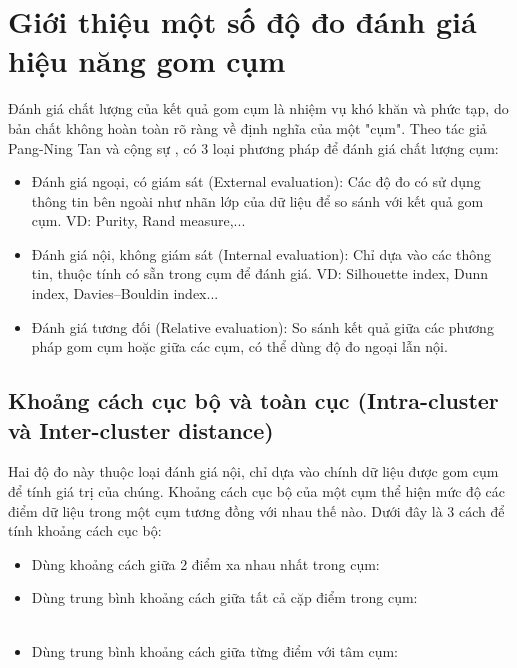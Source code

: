 \section{Giới thiệu một số độ đo đánh giá hiệu năng gom cụm} \label{clusterEvalMetrics}
Đánh giá chất lượng của kết quả gom cụm là nhiệm vụ khó khăn và phức tạp, do bản chất không hoàn toàn rõ ràng về định nghĩa của một "cụm". Theo tác giả Pang-Ning Tan và cộng sự \cite{IntroToDM}, có 3 loại phương pháp để đánh giá chất lượng cụm: 
	\begin{itemize}
		\item Đánh giá ngoại, có giám sát (External evaluation): Các độ đo có sử dụng thông tin bên ngoài như nhãn lớp của dữ liệu để so sánh với kết quả gom cụm.
		VD: Purity, Rand measure,...
		\item Đánh giá nội, không giám sát (Internal evaluation): Chỉ dựa vào các thông tin, thuộc tính có sẵn trong cụm để đánh giá.
		VD: Silhouette index, Dunn index, Davies–Bouldin index...
		\item Đánh giá tương đối (Relative evaluation): So sánh kết quả giữa các phương pháp gom cụm hoặc giữa các cụm, có thể dùng độ đo ngoại lẫn nội.
	\end{itemize}

	\subsection{Khoảng cách cục bộ và toàn cục (Intra-cluster và Inter-cluster distance)} \label{localglobaldistance}
	Hai độ đo này thuộc loại đánh giá nội, chỉ dựa vào chính dữ liệu được gom cụm để tính giá trị của chúng. Khoảng cách cục bộ của một cụm thể hiện mức độ các điểm dữ liệu trong một cụm tương đồng với nhau thế nào. Dưới đây là 3 cách để tính khoảng cách cục bộ:
		\begin{itemize}
			\item Dùng khoảng cách giữa 2 điểm xa nhau nhất trong cụm:\\
			
			\item Dùng trung bình khoảng cách giữa tất cả cặp điểm trong cụm:\\
			\\
			
			\item Dùng trung bình khoảng cách giữa từng điểm với tâm cụm:\\
			\\	
		\end{itemize}
	
